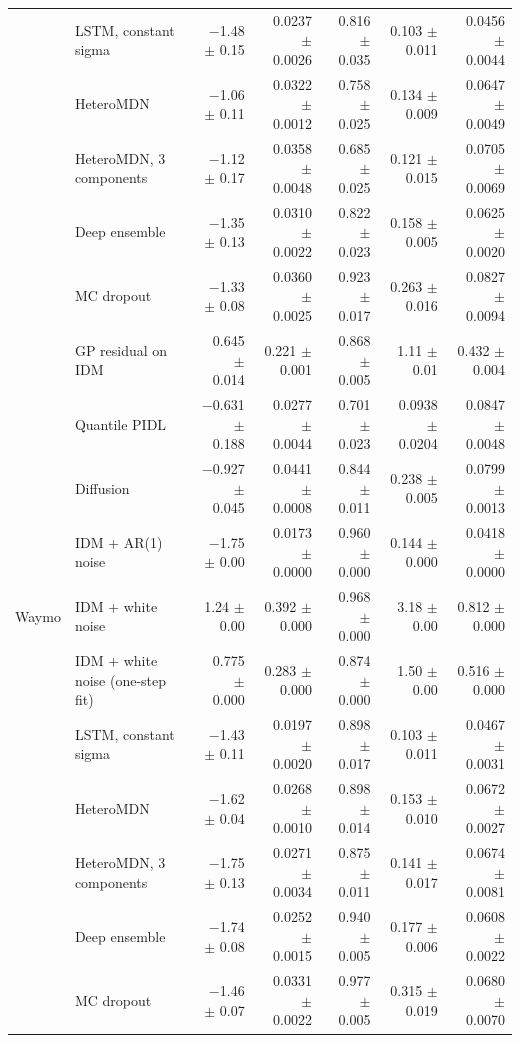 \begin{longtable}{llrrrrr}
 & LSTM, constant sigma & $-$1.48 $\pm$ 0.15 & 0.0237 $\pm$ 0.0026 & 0.816 $\pm$ 0.035 & 0.103 $\pm$ 0.011 & 0.0456 $\pm$ 0.0044 \\
 & HeteroMDN & $-$1.06 $\pm$ 0.11 & 0.0322 $\pm$ 0.0012 & 0.758 $\pm$ 0.025 & 0.134 $\pm$ 0.009 & 0.0647 $\pm$ 0.0049 \\
 & HeteroMDN, 3 components & $-$1.12 $\pm$ 0.17 & 0.0358 $\pm$ 0.0048 & 0.685 $\pm$ 0.025 & 0.121 $\pm$ 0.015 & 0.0705 $\pm$ 0.0069 \\
 & Deep ensemble & $-$1.35 $\pm$ 0.13 & 0.0310 $\pm$ 0.0022 & 0.822 $\pm$ 0.023 & 0.158 $\pm$ 0.005 & 0.0625 $\pm$ 0.0020 \\
 & MC dropout & $-$1.33 $\pm$ 0.08 & 0.0360 $\pm$ 0.0025 & 0.923 $\pm$ 0.017 & 0.263 $\pm$ 0.016 & 0.0827 $\pm$ 0.0094 \\
 & GP residual on IDM & 0.645 $\pm$ 0.014 & 0.221 $\pm$ 0.001 & 0.868 $\pm$ 0.005 & 1.11 $\pm$ 0.01 & 0.432 $\pm$ 0.004 \\
 & Quantile PIDL & $-$0.631 $\pm$ 0.188 & 0.0277 $\pm$ 0.0044 & 0.701 $\pm$ 0.023 & 0.0938 $\pm$ 0.0204 & 0.0847 $\pm$ 0.0048 \\
 & Diffusion & $-$0.927 $\pm$ 0.045 & 0.0441 $\pm$ 0.0008 & 0.844 $\pm$ 0.011 & 0.238 $\pm$ 0.005 & 0.0799 $\pm$ 0.0013 \\
 & IDM + AR(1) noise & $-$1.75 $\pm$ 0.00 & 0.0173 $\pm$ 0.0000 & 0.960 $\pm$ 0.000 & 0.144 $\pm$ 0.000 & 0.0418 $\pm$ 0.0000 \\
\midrule
Waymo & IDM + white noise & 1.24 $\pm$ 0.00 & 0.392 $\pm$ 0.000 & 0.968 $\pm$ 0.000 & 3.18 $\pm$ 0.00 & 0.812 $\pm$ 0.000 \\
 & IDM + white noise (one-step fit) & 0.775 $\pm$ 0.000 & 0.283 $\pm$ 0.000 & 0.874 $\pm$ 0.000 & 1.50 $\pm$ 0.00 & 0.516 $\pm$ 0.000 \\
 & LSTM, constant sigma & $-$1.43 $\pm$ 0.11 & 0.0197 $\pm$ 0.0020 & 0.898 $\pm$ 0.017 & 0.103 $\pm$ 0.011 & 0.0467 $\pm$ 0.0031 \\
 & HeteroMDN & $-$1.62 $\pm$ 0.04 & 0.0268 $\pm$ 0.0010 & 0.898 $\pm$ 0.014 & 0.153 $\pm$ 0.010 & 0.0672 $\pm$ 0.0027 \\
 & HeteroMDN, 3 components & $-$1.75 $\pm$ 0.13 & 0.0271 $\pm$ 0.0034 & 0.875 $\pm$ 0.011 & 0.141 $\pm$ 0.017 & 0.0674 $\pm$ 0.0081 \\
 & Deep ensemble & $-$1.74 $\pm$ 0.08 & 0.0252 $\pm$ 0.0015 & 0.940 $\pm$ 0.005 & 0.177 $\pm$ 0.006 & 0.0608 $\pm$ 0.0022 \\
 & MC dropout & $-$1.46 $\pm$ 0.07 & 0.0331 $\pm$ 0.0022 & 0.977 $\pm$ 0.005 & 0.315 $\pm$ 0.019 & 0.0680 $\pm$ 0.0070 \\

\end{longtable}
